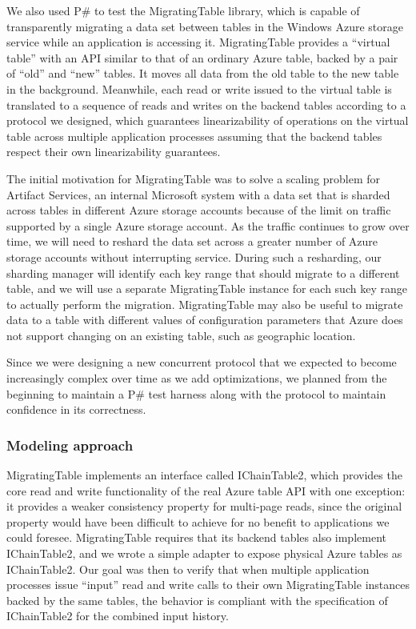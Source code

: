 \documentclass{sig-alternate}
\newcommand{\psharp}{P\#\xspace}
\begin{document}
We also used \psharp to test the MigratingTable library, which is capable of transparently migrating a data set between tables in the Windows Azure storage service while an application is accessing it.  MigratingTable provides a ``virtual table'' with an API similar to that of an ordinary Azure table, backed by a pair of ``old'' and ``new''  tables.  It moves all data from the old table to the new table in the background.  Meanwhile, each read or write issued to the virtual table is translated to a sequence of reads and writes on the backend tables according to a protocol we designed, which guarantees linearizability of operations on the virtual table across multiple application processes assuming that the backend tables respect their own linearizability guarantees.

The initial motivation for MigratingTable was to solve a scaling problem for Artifact Services, an internal Microsoft system with a data set that is sharded across tables in different Azure storage accounts because of the limit on traffic supported by a single Azure storage account.  As the traffic continues to grow over time, we will need to reshard the data set across a greater number of Azure storage accounts without interrupting service.  During such a resharding, our sharding manager will identify each key range that should migrate to a different table, and we will use a separate MigratingTable instance for each such key range to actually perform the migration.  MigratingTable may also be useful to migrate data to a table with different values of configuration parameters that Azure does not support changing on an existing table, such as geographic location.

Since we were designing a new concurrent protocol that we expected to become increasingly complex over time as we add optimizations, we planned from the beginning to maintain a \psharp test harness along with the protocol to maintain confidence in its correctness.

\subsubsection{Modeling approach}

MigratingTable implements an interface called IChainTable2, which provides the core read and write functionality of the real Azure table API with one exception: it provides a weaker consistency property for multi-page reads, since the original property would have been difficult to achieve for no benefit to applications we could foresee.  MigratingTable requires that its backend tables also implement IChainTable2, and we wrote a simple adapter to expose physical Azure tables as IChainTable2.  Our goal was then to verify that when multiple application processes issue ``input'' read and write calls to their own MigratingTable instances backed by the same tables, the behavior is compliant with the specification of IChainTable2 for the combined input history.
\end{document}
